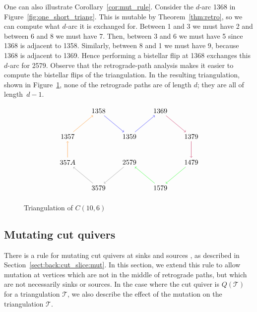 \documentclass[ALCO,Unicode,published]{cedram}
\begin{document}
\begin{exam}
One can also illustrate Corollary~\ref{cor:mut_rule}. Consider the $d$-arc 1368 in Figure~\ref{fig:one_short_triang}. This is mutable by Theorem~\ref{thm:retro}, so we can compute what $d$-arc it is exchanged for. Between 1 and 3 we must have 2 and between 6 and 8 we must have 7. Then, between 3 and 6 we must have 5 since 1368 is adjacent to 1358. Similarly, between 8 and 1 we must have 9, because 1368 is adjacent to 1369. Hence performing a bistellar flip at 1368 exchanges this $d$-arc for 2579. Observe that the retrograde-path analysis makes it easier to compute the bistellar flips of the triangulation. In the resulting triangulation, shown in Figure~\ref{fig:all_short_triang}, none of the retrograde paths are of length $d$; they are all of length~$d - 1$.

\begin{figure}
\caption{Triangulation of $C(10,6)$}\label{fig:all_short_triang}
\[
\begin{tikzpicture}[scale=1.3,xscale=1.2]

\node(1359) at (0,0) {$1359$};
\node(1369) at (1,1) {$1369$};
\node(1358) at (-1,1) {$1358$};
\node(1357) at (-2,0) {$1357$};
\node(1379) at (2,0) {$1379$};
\node(357A) at (-2,-1) {$357A$};
\node(2579) at (0,-1) {$2579$};
\node(1479) at (2,-1) {$1479$};
\node(3579) at (-1,-2) {$3579$};
\node(1579) at (1,-2) {$1579$};

\draw[->,orange] (357A) -- (1357);
\draw[->,orange] (1357) -- (1358);
\draw[->,blue] (1358) -- (1359);
\draw[->,blue] (1359) -- (1369);
\draw[->,purple] (1369) -- (1379);
\draw[->,purple] (1379) -- (1479);
\draw[->,green] (1479) -- (1579);
\draw[->,green] (1579) -- (2579);
\draw[->,gray] (2579) -- (3579);
\draw[->,gray] (3579) -- (357A);

\end{tikzpicture}
\]
\end{figure}
\end{exam}

\subsection{Mutating cut quivers}

There is a rule for mutating cut quivers at sinks and sources \cite{io}, as described in Section~\ref{sect:back:cut_slice:mut}. In this section, we extend this rule to allow mutation at vertices which are not in the middle of retrograde paths, but which are not necessarily sinks or sources. In the case where the cut quiver is $Q(\mathcal{T})$ for a triangulation $\mathcal{T}$, we also describe the effect of the mutation on the triangulation $\mathcal{T}$.
\end{document}
